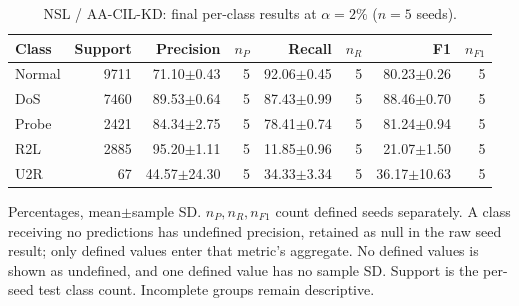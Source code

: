 \begin{table}[t]
\centering\scriptsize
\setlength{\tabcolsep}{3.3pt}
\caption{NSL / AA-CIL-KD: final per-class results at $\alpha=2\%$ ($n=5$ seeds).}\label{tab:forgetting-class-nsl_kdd-aacil-kd}
\begin{tabular}{lrrrrrrr}
\toprule
Class & Support & Precision & $n_P$ & Recall & $n_R$ & F1 & $n_{F1}$ \\
\midrule
Normal & 9711 & 71.10$\pm$0.43 & 5 & 92.06$\pm$0.45 & 5 & 80.23$\pm$0.26 & 5 \\
DoS & 7460 & 89.53$\pm$0.64 & 5 & 87.43$\pm$0.99 & 5 & 88.46$\pm$0.70 & 5 \\
Probe & 2421 & 84.34$\pm$2.75 & 5 & 78.41$\pm$0.74 & 5 & 81.24$\pm$0.94 & 5 \\
R2L & 2885 & 95.20$\pm$1.11 & 5 & 11.85$\pm$0.96 & 5 & 21.07$\pm$1.50 & 5 \\
U2R & 67 & 44.57$\pm$24.30 & 5 & 34.33$\pm$3.34 & 5 & 36.17$\pm$10.63 & 5 \\
\bottomrule
\end{tabular}
\par\smallskip\begin{minipage}{0.98\textwidth}\scriptsize Percentages, mean$\pm$sample SD. $n_P,n_R,n_{F1}$ count defined seeds separately. A class receiving no predictions has undefined precision, retained as null in the raw seed result; only defined values enter that metric's aggregate. No defined values is shown as undefined, and one defined value has no sample SD. Support is the per-seed test class count. Incomplete groups remain descriptive.\end{minipage}
\end{table}

